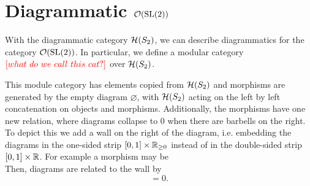 \section{Diagrammatic $\mathcal{O}(\operatorname{SL}(2))$}

With the diagrammatic category $\mathcal{H}(S_2)$, we can describe diagrammatics for the category $\mathcal{O}(\operatorname{SL}(2))$. In particular, we define a modular category ${\color{red}[what~do~we~call~this~cat?]}$ over $\mathcal{H}(S_2)$. %

This module category has elements copied from $\mathcal{H}(S_2)$ and morphisms are generated by the empty diagram $\varnothing$, with $\mathcal{H}(S_2)$ acting on the left by left concatenation on objects and morphisms. Additionally, the morphisms have one new relation, where diagrams collapse to $0$ when there are barbells on the right. To depict this we add a wall on the right of the diagram, i.e. embedding the diagrams in the one-sided strip $[0,1] \times \mathbb{R}_{\geq 0}$ instead of in the double-sided strip $[0,1] \times \mathbb{R}$. For example a morphism may be
\begin{equation*}
    
\end{equation*}
Then, diagrams are related to the wall by
\begin{equation}
     = 0.
\end{equation}


